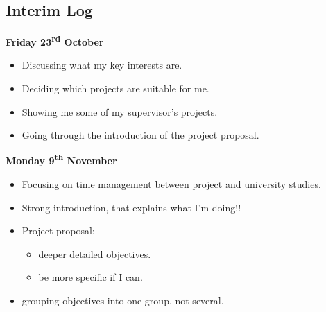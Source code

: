 \documentclass[a4paper, 12pt]{article}
\begin{document}
        \subsection{Interim Log}
            \textbf{Friday 23\textsuperscript{rd} October}
                \begin{itemize}
                    \item Discussing what my key interests are.
                    \item Deciding which projects are suitable for me.
                    \item Showing me some of my supervisor's projects. 
                    \item Going through the introduction of the project proposal. \\
                \end{itemize}
            \textbf{Monday 9\textsuperscript{th} November} 
                \begin{itemize}
                    \item Focusing on time management between project and university
                    studies.
                    \item Strong introduction, that explains what I'm doing!!
                    \item Project proposal:
                    \begin{itemize}
                        \item deeper detailed objectives.
                        \item be more specific if I can.
                    \end{itemize}
                    \item grouping objectives into one group, not several.
                \end{itemize}

    \clearpage
\end{document}

